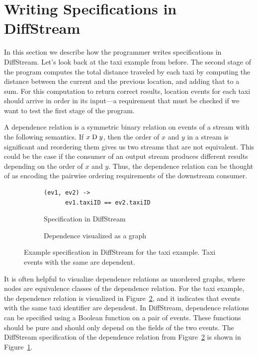 \section{Writing Specifications in DiffStream}
\label{diffstream:sec:dependence-relation}

In this section we describe how the programmer writes specifications in DiffStream.
Let's look back at the taxi example from before. The second stage of the program
computes the total distance traveled by each taxi by computing the
distance between the current and the previous location, and adding
that to a sum. For this computation to return correct results,
location events for each taxi should arrive in order in its input---a
requirement that must be checked if we want to test the first stage of
the program.

A dependence relation is a symmetric binary relation on events of a
stream with the following semantics.
If $x \mathrel{\mathrm{D}} y$, then the order of
$x$ and $y$ in a stream is significant and reordering them gives us
two streams that are not equivalent. This could be the case if the
consumer of an output stream produces different results depending on
the order of $x$ and $y$.  Thus, the dependence relation can be
thought of as encoding the pairwise ordering requirements of the
downstream consumer.

\begin{figure}[t]
  \centering \footnotesize{}
  \begin{subfigure}[b]{0.46\textwidth}
    \centering
    \begin{lstlisting}[basicstyle=\ttfamily\small]
  (ev1, ev2) ->
      ev1.taxiID == ev2.taxiID
    \end{lstlisting}
    \caption{Specification in DiffStream}
    \label{diffstream:fig:simple-taxi-example-dependency-spec}
  \end{subfigure}%
  \qquad
  \begin{subfigure}[b]{0.46\textwidth}
    \centering
    \caption{Dependence visualized as a graph}
    \label{diffstream:fig:simple-taxi-example-dependency-vis}
  \end{subfigure}%
  \caption[DiffStream example specification 1.]{Example specification in DiffStream for the taxi example. Taxi events with the same  are dependent.}
  \label{diffstream:fig:example-dependencies}
\end{figure}

It is often helpful to visualize dependence relations as unordered
graphs, where nodes are equivalence classes of the dependence
relation. For the taxi example, the dependence relation is visualized
in Figure~\ref{diffstream:fig:simple-taxi-example-dependency-vis}, and it indicates that
events with the same taxi identifier are dependent. In DiffStream,
dependence relations can be specified using a Boolean function on a pair
of events. These functions should be pure and should only depend on
the fields of the two events. The DiffStream specification of the dependence relation from Figure~\ref{diffstream:fig:simple-taxi-example-dependency-vis} is shown in Figure~\ref{diffstream:fig:simple-taxi-example-dependency-spec}.

